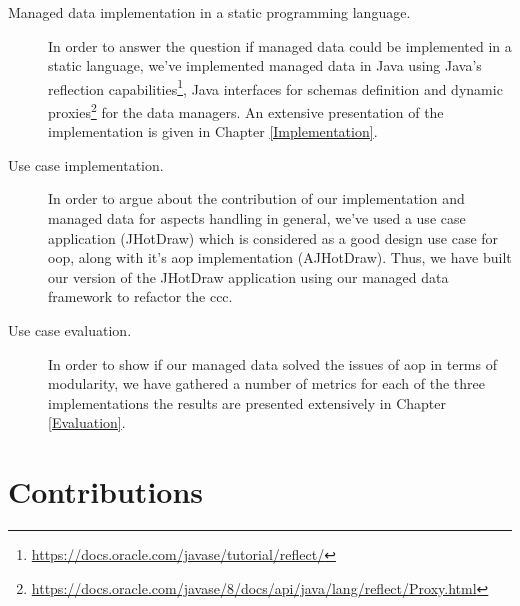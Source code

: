 \begin{description}

  \item[Managed data implementation in a static programming language.]
  In order to answer the question if managed data could be implemented in a static language, we've implemented managed data in Java 
  using Java's reflection capabilities\footnote{\url{https://docs.oracle.com/javase/tutorial/reflect/}}, Java interfaces 
  for schemas definition and dynamic proxies\footnote{\url{https://docs.oracle.com/javase/8/docs/api/java/lang/reflect/Proxy.html}}
  for the data managers. An extensive presentation of the implementation is given in Chapter \ref{Implementation}.

  \item[Use case implementation.] 
  In order to argue about the contribution of our implementation and managed data for aspects handling in general, we've used a use case application (JHotDraw) which is considered as a good design use case for \ac{oop}, along with it's \ac{aop} implementation (AJHotDraw).
  Thus, we have built our version of the JHotDraw application using our managed data framework to refactor the \ac{ccc}.

  \item[Use case evaluation.]
  In order to show if our managed data solved the issues of \ac{aop} in terms of modularity, we have gathered a number of metrics for each of the three implementations the results are presented extensively in Chapter \ref{Evaluation}.

\end{description}	

\section{Contributions}\label{Contributions}

